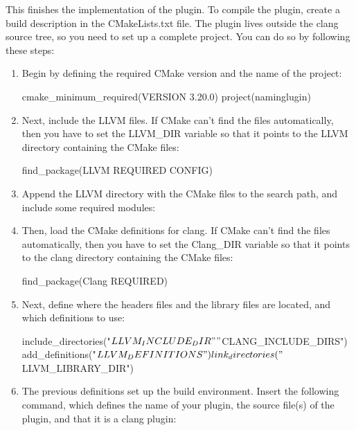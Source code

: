 This finishes the implementation of the plugin. To compile the plugin, create a build description in the CMakeLists.txt file. The plugin lives outside the clang source tree, so you need to set up a complete project. You can do so by following these steps:

\begin{enumerate}
\item
Begin by defining the required CMake version and the name of the project:

\begin{cmake}
cmake_minimum_required(VERSION 3.20.0)
project(naminglugin)
\end{cmake}

\item
Next, include the LLVM files. If CMake can’t find the files automatically, then you have to set the LLVM\_DIR variable so that it points to the LLVM directory containing the CMake files:

\begin{cmake}
find_package(LLVM REQUIRED CONFIG)
\end{cmake}

\item
Append the LLVM directory with the CMake files to the search path, and include some required modules:


\item
Then, load the CMake definitions for clang. If CMake can’t find the files automatically, then you have to set the Clang\_DIR variable so that it points to the clang directory containing the CMake files:

\begin{cmake}
find_package(Clang REQUIRED)
\end{cmake}

\item
Next, define where the headers files and the library files are located, and which definitions to use:

\begin{cmake}
include_directories("${LLVM_INCLUDE_DIR}"
                    "${CLANG_INCLUDE_DIRS}")
add_definitions("${LLVM_DEFINITIONS}")
link_directories("${LLVM_LIBRARY_DIR}")
\end{cmake}

\item
The previous definitions set up the build environment. Insert the following command, which defines the name of your plugin, the source file(s) of the plugin, and that it is a clang plugin:


\end{enumerate}
